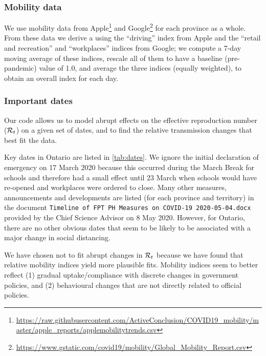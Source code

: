 \documentclass[12pt]{article}\usepackage[]{graphicx}\usepackage[]{color}
\begin{document}
\hypertarget{Mobility data}{}
\subsubsection*{Mobility data}

We use mobility data from
Apple\footnote{\url{https://raw.githubusercontent.com/ActiveConclusion/COVID19_mobility/master/apple_reports/applemobilitytrends.csv}}
and
Google\footnote{\url{https://www.gstatic.com/covid19/mobility/Global_Mobility_Report.csv}}
for each province as a whole. From these data we derive a
 using the ``driving'' index from Apple
and the ``retail and recreation'' and ``workplaces'' indices from
Google; we compute a 7-day moving average of these indices, rescale
all of them to have a baseline (pre-pandemic) value of 1.0, and
average the three indices (equally weighted), to obtain an overall
index for each day.

\subsubsection*{Important dates}

Our code allows us to model abrupt effects on the effective
reproduction number (${\mathcal R}_t$) on a given set of dates, and to find the
relative transmission changes that best fit the data.

Key dates in Ontario are listed in \cref{tab:dates}.  We ignore the
initial declaration of emergency on 17 March 2020 because this
occurred during the March Break for schools and therefore had a small
effect until 23 March when schools would have re-opened and workplaces
were ordered to close.  Many other measures, announcements and
developments are listed (for each province and territory) in the
document \texttt{Timeline of FPT PH Measures on COVID-19
  2020-05-04.docx} provided by the Chief Science Advisor on 8 May
2020.  However, for Ontario, there are no other obvious dates
that seem to be likely to be associated with a major change in social
distancing.


We have chosen not to fit abrupt changes in ${\mathcal R}_t$ because we have
found that \hypertarget{Mobility data}{relative mobility indices}
yield more plausible fits.  Mobility indices seem to better reflect
(1) gradual uptake/compliance with discrete changes in government
policies, and (2) behavioural changes that are not directly related to
official policies.
\end{document}
